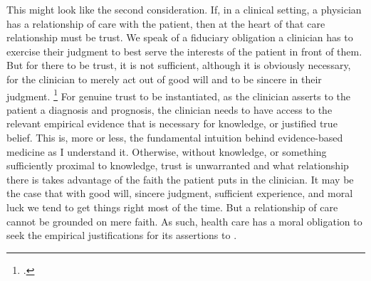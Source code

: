 \documentclass[letterpaper,notitlepage,12pt]{article}
\begin{document}
This might look like the second consideration.
If, in a clinical setting, a physician has a relationship of care with the
patient, then at the heart of that care relationship must be trust.
We speak of a fiduciary obligation a clinician has to exercise their judgment
to best serve the interests of the patient in front of them.
But for there to be trust, it is not sufficient, although it is obviously
necessary, for the clinician to merely act out of good will and to be sincere in
their judgment.
\footcite[p. 353]
  {clifford}
For genuine trust to be instantiated, as the clinician asserts to the patient a
diagnosis and prognosis, the clinician needs to have access to the relevant
empirical evidence that is necessary for knowledge, or justified true belief.
This is, more or less, the fundamental intuition behind evidence-based medicine
as I understand it.
Otherwise, without knowledge, or something sufficiently proximal to knowledge,
trust is unwarranted and what relationship there is takes advantage of the faith
the patient puts in the clinician.
It may be the case that with good will, sincere judgment, sufficient
experience, and moral luck we tend to get things right most of the time.
But a relationship of care cannot be grounded on mere faith.
As such, health care has a moral obligation to seek the empirical justifications
for its assertions to .

\printbibliography
\end{document}
